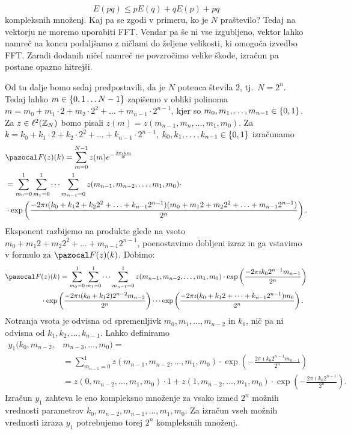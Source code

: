 \begin{equation}
  E(pq) \leq pE(q) + qE(p) + pq
\end{equation}
kompleksnih množenj. Kaj pa se zgodi v primeru, ko je $N$ praštevilo? Tedaj na vektorju ne moremo uporabiti FFT. Vendar pa še ni vse izgubljeno, vektor lahko namreč na koncu podaljšamo z ničlami do željene velikosti, ki omogoča izvedbo FFT. Zaradi dodanih ničel namreč ne povzročimo velike škode, izračun pa postane opazno hitrejši.

Od tu dalje bomo sedaj predpostavili, da je $N$ potenca števila 2, tj.\ $N = 2^n$. Tedaj lahko $m \in \left\{0,1 \ldots N-1\right\}$ zapišemo v obliki polinoma $m = m_0 + m_1 \cdot 2 + m_2 \cdot 2^2 + \ldots + m_{n-1} \cdot 2^{n-1}$, kjer so $m_0, m_1, \ldots, m_{n-1} \in \left\{0, 1\right\}$. Za $z \in \ell^2(\mathbb Z_N)$ bomo pisali $z(m) = z(m_{n-1}, m_n, \ldots, m_1, m_0)$. Za $k = k_0 + k_1 \cdot 2 + k_2 \cdot 2^2 + \ldots + k_{n-1} \cdot 2^{n-1}$, $k_0, k_1, \ldots, k_{n-1} \in \left\{0, 1\right\}$ izračunamo
%
\begin{align*}
 & \F(z)(k) = \sum_{m=0}^{N-1} z(m) e^{-\frac{2\pi\imath km}{N}} \\
 & = \sum_{m_0 = 0}^1 \sum_{m_1 = 0}^1 \cdots \sum_{m_{n-1} = 0}^1 z(m_{n-1}, m_{n-2}, \ldots, m_1, m_0) \cdot \\
 & \cdot \exp\left(\frac{-2\pi\imath(k_0 + k_1 2 + k_2 2^2 + \ldots + k_{n-1} 2^{n-1})(m_0 + m_1 2 + m_2 2^2 + \ldots + m_{n-1} 2^{n-1})}{2^n}\right). 
\end{align*}
%
Eksponent razbijemo na produkte glede na vsoto $m_0 + m_1 2 + m_2 2^2 + \ldots + m_{n-1} 2^{n-1}$, poenostavimo dobljeni izraz in ga vstavimo v formulo za $\F(z)(k)$. Dobimo:
%
\begin{align*}
\F & (z)(k) = \sum_{m_0 = 0}^1 \sum_{m_1 = 0}^1 \cdots \sum_{m_{n-1} = 0}^1 z(m_{n-1}, m_{n-2}, \ldots, m_1, m_0) \cdot \exp\left(\frac{-2\pi\imath k_02^{n-1}m_{n-1}}{2^n}\right) \\
& \cdot \exp\left(\frac{-2\pi\imath (k_0 + k_1 2)2^{n-2}m_{n-2}}{2^n}\right) \cdots \exp\left(\frac{-2\pi\imath (k_0 + k_1 2 + \cdots +  k_{n-1} 2^{n-1}) m_0}{2^n}\right).
\end{align*}
%
Notranja vsota je odvisna od spremenljivk $m_0, m_1, \ldots, m_{n-2}$ in $k_0$, nič pa ni odvisna od $k_1, k_2, \ldots, k_{n-1}$. Lahko definiramo
\begin{align*}
  y_1(k_0, m_{n-2}, & m_{n-3},  \ldots, m_0) = \\
  & = \sum_{m_{n-1}=0}^{1} z(m_{n-1},m_{n-2},\ldots,m_1,m_0) \cdot \exp\left(-\frac{2\pi\imath k_0 2^{n-1}m_{n-1}}{2^n}\right)\\
  & = z(0,m_{n-2},\ldots,m_1,m_0) \cdot 1 + z(1,m_{n-2},\ldots,m_1,m_0)\cdot \exp\left(-\frac{2\pi\imath k_0 2^{n-1}}{2^n}\right).
\end{align*}
%
Izračun $y_1$ zahteva le eno kompleksno množenje za vsako izmed $2^n$ možnih vrednosti parametrov $k_0, m_{n-2}, m_{n-1}, \ldots, m_1, m_0$. Za izračun vseh možnih vrednosti izraza $y_1$ potrebujemo torej $2^n$ kompleksnih množenj.

